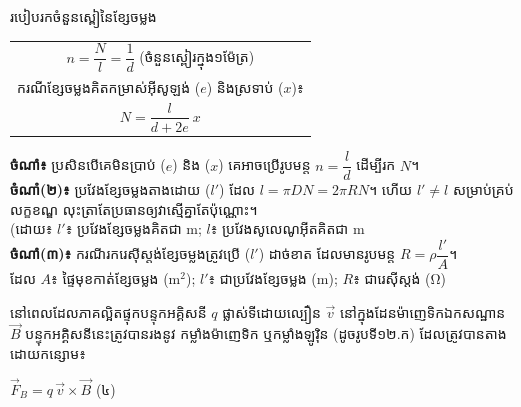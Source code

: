 \vspace{0.7em}
\noindent
\begin{formulabox}[breakable=false]{
	របៀបរកចំនួនស្ពៀនៃខ្សែចម្លង }
	\begin{center}
	\begin{tabular}{@{}c@{}}
		$\boxed{n = \dfrac{N}{l} = \dfrac{1}{d}}$ \quad (ចំនួនស្ពៀរក្នុង១ម៉ែត្រ)\\[0.6em]
		ករណីខ្សែចម្លងគិតកម្រាស់អ៊ីសូឡង់ ($e$) និងស្រទាប់ ($x$)៖\\[0.6em]
		$\boxed{N = \dfrac{l}{d + 2e}\ x}$
	\end{tabular}
	\end{center}
\end{formulabox}

\begin{center}
	\textbf{ចំណាំ៖  } ប្រសិនបើគេមិនប្រាប់ ($e$) និង ($x$) គេអាចប្រើរូបមន្ត $n = \dfrac{l}{d}$ ដើម្បីរក $N$។\\
	\textbf{ចំណាំ(២)៖   }
	ប្រវែងខ្សែចម្លងតាងដោយ ($l'$) ដែល
	$l = \pi DN = 2\pi RN$។ ហើយ
	$\boxed{l' \ne l}$ សម្រាប់គ្រប់លក្ខខណ្ឌ
	លុះត្រាតែប្រធានឲ្យវាស្មើគ្នាតែប៉ុណ្ណោះ។\\
	(ដោយ៖ $l'$៖ ប្រវែងខ្សែចម្លងគិតជា $\mathrm{m}$;
	$l$៖ ប្រវែងសូលេណូអុីតគិតជា $\mathrm{m}$\\
	\textbf{ចំណាំ(៣)៖   }
	ករណីរករេសុីស្តង់ខ្សែចម្លងត្រូវប្រើ ($l'$)
	ដាច់ខាត ដែលមានរូបមន្ត
	$\boxed{R = \rho\dfrac{l'}{A}}$។\\ ដែល $A$៖
	ផ្ទៃមុខកាត់ខ្សែចម្លង ($\mathrm{m^2}$);
	$l'$៖ ជាប្រវែងខ្សែចម្លង ($\mathrm{m}$); $R$៖ ជារេសុីស្តង់ ($\mathrm{\Omega}$)\\
\end{center}


\noindent
\begin{minipage}[t]{0.55\textwidth}
	\raggedright
	នៅពេលដែលភាគល្អិតផ្ទុកបន្ទុកអគ្គិសនី $q$ ផ្លាស់ទីដោយល្បឿន $\vec{v}$
	នៅក្នុងដែនម៉ាញេទិកឯកសណ្ឋាន $\vec{B}$ បន្ទុកអគ្គិសនីនេះត្រូវបានរងនូវ
	កម្លាំងម៉ាញេទិក ឬកម្លាំងឡូរ៉ិន (ដូចរូបទី១២.ក) ដែលត្រូវបានតាងដោយកន្សោម៖

	\vspace{0.3em}
	\begin{center}
		$\boxed{\vec{F}_B = q\,\vec{v} \times \vec{B}}$ \quad (៤)
	\end{center}
\end{minipage}%
\hfill
\begin{minipage}[t]{0.40\textwidth}
	\vspace{0pt}
	\hspace*{0.5em}%
\end{minipage}

